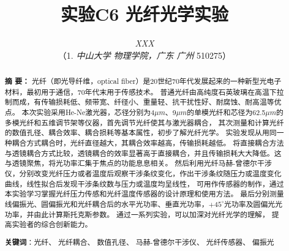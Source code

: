\documentclass[10pt,a4paper,twoside,UTF8]{ctexart}
\begin{document}
\title{\LARGE\textbf{实验C6 光纤光学实验}\footnotemark[1]}
\author{\large\textit{XXX\footnotemark[2]}
\\ \normalsize{（1. \textit{中山大学 物理学院，广东 广州 }510275）}}
\date{}%


	\maketitle  %
  	\renewcommand{\abstractname} {} %
	\begin{abstract}
	\vspace{-3em}
	{\bf 摘{} 要：}
	{\small 
	光纤（即光导纤维，optical fiber）是20世纪70年代发展起来的一种新型光电子材料，最初用于通信，70年代末用于传感技术。
	普通光纤由高纯度石英玻璃在高温下拉制而成，有传输损耗低、频带宽、纤径小、重量轻、抗干扰性好、耐腐蚀、耐高温等优点。 
	本次实验采用He-Ne激光器，芯径分别为4$\mu m$、9$\mu m$的单模光纤和芯径为62.5$\mu m$的多模光纤和五维调节架等仪器，首先调节光纤使其与激光器耦合，
	其次测量和计算光纤的数值孔径、耦合效率、耦合损耗等基本属性，初步了解光纤光学。
	实验发现从用同一种耦合方式耦合时，光纤直径越大，其耦合效率越高，传输损耗越低。
	将直接耦合方法与透镜耦合方式比较，透镜耦合的效率显著高于直接耦合，并且传输损耗大大降低。这与透镜聚焦，将光功率汇集于焦点的功能息息相关。
	然后利用光纤马赫-曾德尔干涉仪，分别改变光纤压力或者温度后观察干涉条纹变化，作出干涉条纹随压力或温度变化曲线，线性拟合后发现干涉条纹数与压力或温度均呈线性，
	可用作传感器的制作，通过本实验学习掌握光纤压力传感和光纤温度传感器的设计原理和使用方法。
	最后分别测量线偏振光、圆偏振光和光纤耦合后的水平光功率、垂直光功率，$+45^{\circ}$光功率及圆偏光光功率，并由此计算斯托克斯参数。
	通过一系列实验，可以加深对光纤光学的理解， 提高实验者的综合创新能力。}

	\par%
	\textbf{关键词}：光纤、 光纤耦合、 数值孔径、 马赫-曾德尔干涉仪、 光纤传感器、 偏振光
	\vspace{2em}
	\end{abstract}

\renewcommand{\thefootnote}{\fnsymbol{footnote}}
\end{document}
